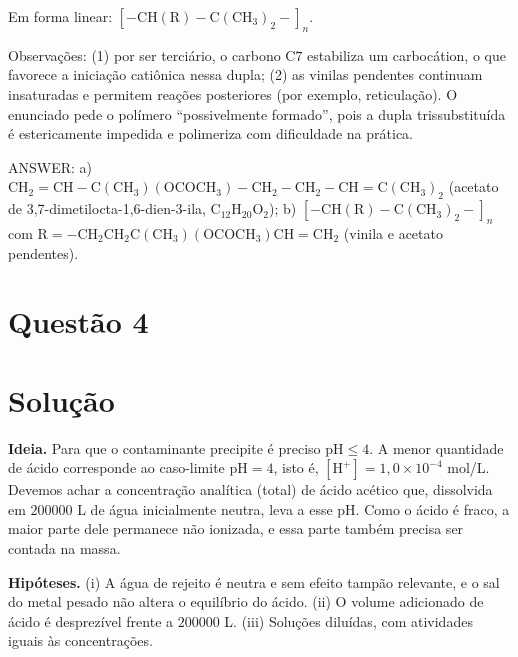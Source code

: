 \documentclass{article}%
\begin{document}
\begin{center}
\end{center}

Em forma linear: $\left[-\mathrm{CH(R)-C(CH_3)_2-}\right]_n$.

Observações: (1) por ser terciário, o carbono $\mathrm{C7}$ estabiliza um carbocátion, o que favorece a iniciação catiônica nessa dupla; (2) as vinilas pendentes continuam insaturadas e permitem reações posteriores (por exemplo, reticulação). O enunciado pede o polímero ``possivelmente formado'', pois a dupla trissubstituída é estericamente impedida e polimeriza com dificuldade na prática.

\medskip
ANSWER: a) $\mathrm{CH_2{=}CH{-}C(CH_3)(OCOCH_3){-}CH_2{-}CH_2{-}CH{=}C(CH_3)_2}$ (acetato de 3,7-dimetilocta-1,6-dien-3-ila, $\mathrm{C_{12}H_{20}O_2}$); b) $\left[-\mathrm{CH(R)-C(CH_3)_2-}\right]_n$ com $\mathrm{R=-CH_2CH_2C(CH_3)(OCOCH_3)CH{=}CH_2}$ (vinila e acetato pendentes).%
\newpage%
\section*{Questão 4}

\section*{Solução}

\textbf{Ideia.} Para que o contaminante precipite é preciso $\text{pH}\le 4$. A menor quantidade de ácido corresponde ao caso-limite $\text{pH}=4$, isto é, $[\text{H}^+]=1{,}0\times10^{-4}$ mol/L. Devemos achar a concentração analítica (total) de ácido acético que, dissolvida em $200000$ L de água inicialmente neutra, leva a esse pH. Como o ácido é fraco, a maior parte dele permanece não ionizada, e essa parte também precisa ser contada na massa.

\textbf{Hipóteses.} (i) A água de rejeito é neutra e sem efeito tampão relevante, e o sal do metal pesado não altera o equilíbrio do ácido. (ii) O volume adicionado de ácido é desprezível frente a $200000$ L. (iii) Soluções diluídas, com atividades iguais às concentrações.
\end{document}
